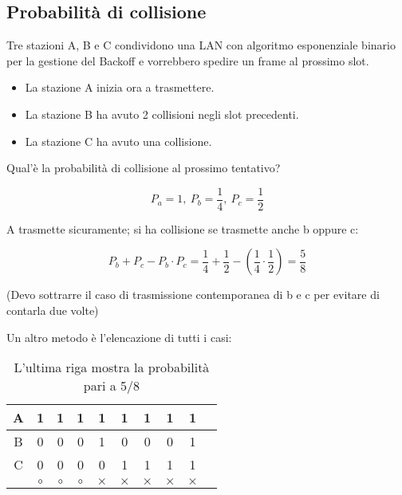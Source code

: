     \subsection{Probabilità di collisione}
        \problem
        Tre stazioni A, B e C condividono una LAN con algoritmo esponenziale binario per la gestione del Backoff e vorrebbero spedire un frame al prossimo slot.

        \begin{itemize}
            \item La stazione A inizia ora a trasmettere.
            \item La stazione B ha avuto 2 collisioni negli slot precedenti.
            \item La stazione C ha avuto una collisione.
        \end{itemize}

        Qual'è la probabilità di collisione al prossimo tentativo?

        \solution
        \begin{equation*}
            P_a = 1, ~ P_b = \frac{1}{4}, ~ P_c = \frac{1}{2}
        \end{equation*}

        A trasmette sicuramente; si ha collisione se trasmette anche b oppure c:

        \begin{equation*}
            P_b + P_c - P_b \cdot P_c = \frac{1}{4} + \frac{1}{2} - \left(\frac{1}{4} \cdot \frac{1}{2}\right) = \frac{5}{8}
        \end{equation*}

        (Devo sottrarre il caso di trasmissione contemporanea di b e c per evitare di contarla due volte)

        Un altro metodo è l'elencazione di tutti i casi:

        \begin{table}[H]
            \centering
            \begin{tabular}{c|c|c|c|c|c|c|c|c|c}
                \hline
                A & 1 & 1 & 1 & 1 & 1 & 1 & 1 & 1\\
                \hline
                B & 0 & 0 & 0 & 1 & 0 & 0 & 0 & 1\\
                \hline
                C & 0 & 0 & 0 & 0 & 1 & 1 & 1 & 1\\
                \hline
                & $\circ$ & $\circ$ & $\circ$ & $\times$ & $\times$ & $\times$ & $\times$ & $\times$ \\
                \cline{2-9}
            \end{tabular}
            \caption*{L'ultima riga mostra la probabilità pari a 5/8}
            \label{table:elenco}
        \end{table}